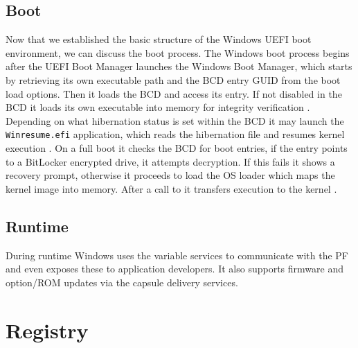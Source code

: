 \subsection{Boot}

Now that we established the basic structure of the Windows UEFI boot environment, we can discuss the boot process.
The Windows boot process begins after the UEFI Boot Manager launches the Windows Boot Manager, which starts by retrieving its own executable path and the \ac{BCD} entry GUID from the boot load options.
Then it loads the \ac{BCD} and access its entry.
If not disabled in the \ac{BCD} it loads its own executable into memory for integrity verification \cite[Section 12]{windows-internals-7-part2}.
Depending on what hibernation status is set within the \ac{BCD} it may launch the \lstinline{Winresume.efi} application, which reads the hibernation file and resumes kernel execution \cite[Section 12]{windows-internals-7-part2}.
On a full boot it checks the \ac{BCD} for boot entries, if the entry points to a BitLocker encrypted drive, it attempts decryption.
If this fails it shows a recovery prompt, otherwise it proceeds to load the \ac{OS} loader  which maps the kernel image  into memory. After a call to  it transfers execution to the kernel \cite[Section 12]{windows-internals-7-part2}.

\subsection{Runtime}

During runtime Windows uses the variable services to communicate with the \ac{PF} and even exposes these to application developers.
It also supports firmware and option\-/\ac{ROM} updates via the capsule delivery services.

\section{Registry}

